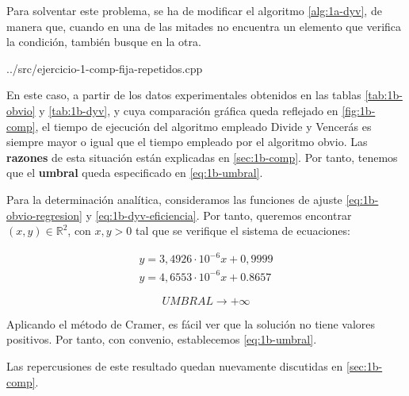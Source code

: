Para solventar este problema, se ha de modificar el algoritmo \ref{alg:1a-dyv}, de manera que, cuando en una de las mitades
no encuentra un elemento que verifica la condición, también busque en la otra.






{../src/ejercicio-1-comp-fija-repetidos.cpp} 


En este caso, a partir de los datos experimentales obtenidos en las tablas \ref{tab:1b-obvio} y \ref{tab:1b-dyv}, y cuya comparación
gráfica queda reflejado en \ref{fig:1b-comp}, el tiempo de ejecución del algoritmo empleado Divide y Vencerás
es siempre mayor o igual que el tiempo empleado por el algoritmo obvio. Las \textbf{razones} de esta situación están
explicadas en \ref{sec:1b-comp}. Por tanto, tenemos que el \textbf{umbral} queda especificado en \ref{eq:1b-umbral}. 

Para la determinación analítica, consideramos las funciones de ajuste \ref{eq:1b-obvio-regresion} y \ref{eq:1b-dyv-eficiencia}. Por tanto,
queremos encontrar $(x,y) \in \mathbb R ^2$, con $x,y>0$ tal que se 
verifique el sistema de ecuaciones:

\begin{eqnarray}
	 y = 3,4926 \cdot 10 ^{-6} x + 0,9999 \\
	 y = 4,6553 \cdot 10^{-6} x + 0.8657
\end{eqnarray} 

\begin{equation}
    \boxed{UMBRAL \rightarrow +\infty}
    \label{eq:1b-umbral}
\end{equation}

Aplicando el método de Cramer, es fácil ver que la solución no tiene valores
positivos. Por tanto, con convenio, establecemos \ref{eq:1b-umbral}.

Las repercusiones de este resultado quedan nuevamente discutidas en \ref{sec:1b-comp}.

